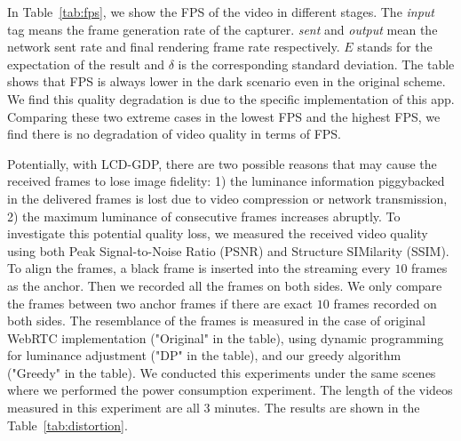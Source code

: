 In Table~\ref{tab:fps}, we show the FPS of the video in different
stages. The {\it input} tag means the frame generation rate of the
capturer. {\it sent} and {\it output} mean the network sent rate and
final rendering frame rate respectively. $E$ stands for the
expectation of the result and $\delta$ is the corresponding standard
deviation. The table shows that FPS is always lower in the dark scenario
even in the original scheme. We find this quality degradation
is due to the specific implementation of this app. Comparing these two
extreme cases in the lowest FPS and the highest FPS,  we find there is no degradation of video quality in terms of FPS.

Potentially, with LCD-GDP, there are two possible reasons that may
cause the received frames to lose image fidelity: 1) the luminance
information piggybacked in the delivered frames is lost due to video
compression or network transmission, 2) the maximum luminance of
consecutive frames increases abruptly. To investigate this potential
quality loss, we measured the received video quality using both Peak
Signal-to-Noise Ratio (PSNR) and Structure SIMilarity (SSIM). To align
the frames, a black frame is inserted into the streaming every $10$
frames as the anchor. Then we recorded all the frames on both
sides. We only compare the frames between two anchor frames if there
are exact $10$ frames recorded on both sides.  The resemblance of the
frames is measured in the case of  original WebRTC implementation
("Original" in the table), using dynamic programming for luminance
adjustment ("DP" in the table), and our greedy algorithm ("Greedy" in
the table).  We conducted this experiments under the same scenes where
we performed the power consumption experiment. The length of the
videos measured in  this experiment are all $3$ minutes. The results
are shown in the Table~\ref{tab:distortion}.

